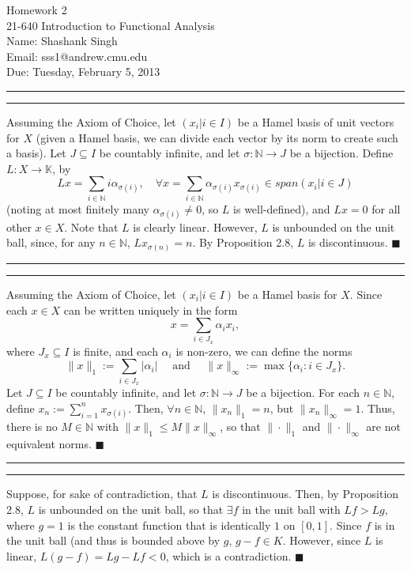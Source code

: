 \documentclass[11pt]{article}
\makeatletter
\newcounter{questionCounter}
\newcounter{partCounter}[questionCounter]
\newenvironment{question}[2][\arabic{questionCounter}]{%
    \setcounter{partCounter}{0}%
    \vspace{.25in} \hrule \vspace{0.5em}%
        \noindent{\bf #2}%
    \vspace{0.8em} \hrule \vspace{.10in}%
    \addtocounter{questionCounter}{1}%
}{}
\newcommand{\myname}{Shashank Singh}
\newcommand{\myandrew}{sss1@andrew.cmu.edu}
\newcommand{\myclass}{21-640 Introduction to Functional Analysis}
\newcommand{\myhwnum}{2}
\newcommand{\duedate}{Tuesday, February 5, 2013}
\renewcommand{\qed}{\quad $\blacksquare$}
\newcommand{\N}{\mathbb{N}} %
\makeatother
\begin{document}
\thispagestyle{plain}

{\Large Homework \myhwnum} \\
\myclass \\
Name: \myname \\
Email: \myandrew \\
Due: \duedate \\

\begin{question}{Problem 2}
Assuming the Axiom of Choice, let $(x_i | i \in I)$ be a Hamel basis of unit
vectors for $X$ (given a Hamel basis, we can divide each vector by its norm to
create such a basis).
Let $J \subseteq I$ be countably infinite, and let $\sigma: \N \rightarrow J$
be a bijection. Define $L: X \rightarrow \mathbb{K}$, by 
\[
L x = \sum_{i \in \N}i\alpha_{\sigma(i)},
\quad \forall x = \sum_{i \in \N}\alpha_{\sigma(i)}x_{\sigma(i)} \in 
span(x_i | i \in J)\]
(noting at most finitely many $\alpha_{\sigma(i)} \neq 0$,
so $L$ is well-defined), and $L x = 0$ for all other $x \in X$.
Note that $L$ is clearly linear. However, $L$ is unbounded on the unit ball,
since, for any $n \in \N$, $L x_{\sigma(n)} = n$. By Proposition 2.8, $L$ is
discontinuous. \qed
\end{question}

\begin{question}{Problem 4}
Assuming the Axiom of Choice, let $(x_i | i \in I)$ be a Hamel basis for $X$.
Since each $x \in X$ can be written uniquely in the form
\[
 x = \sum_{i \in J_x} \alpha_i x_i,
\]
where $J_x \subseteq I$ is finite, and each $\alpha_i$ is non-zero, we can
define the norms
\[
 \|x\|_1 := \sum_{i \in J_x} |\alpha_i|
 \quad\mbox{ and }\quad
 \|x\|_{\infty} := \max\{\alpha_i : i \in J_x\}.
\]
Let $J \subseteq I$ be countably infinite, and let $\sigma : \N \rightarrow J$
be a bijection.
For each $n \in \N$, define $x_n := \sum_{i = 1}^{n} x_{\sigma(i)}$.
Then, $\forall n \in \N$, $\|x_n\|_1 = n$, but $\|x_n\|_{\infty} = 1$.
Thus, there is no $M \in \N$ with $\|x\|_1 \leq M\|x\|_{\infty}$, so that
$\|\cdot\|_1$ and $\|\cdot\|_{\infty}$ are not equivalent norms. \qed
\end{question}

\begin{question}{Problem 6}
Suppose, for sake of contradiction, that $L$ is discontinuous. Then, by
Proposition 2.8, $L$ is unbounded on the unit ball, so that $\exists f$ in the
unit ball with $Lf > Lg$, where $g = 1$ is the constant function that is
identically $1$ on $[0,1]$. Since $f$ is in the unit ball (and thus is bounded
above by $g$, $g - f \in K$. However, since $L$ is linear, $L(g - f) = Lg - Lf
< 0$, which is a contradiction. \qed
\end{question}
\end{document}
